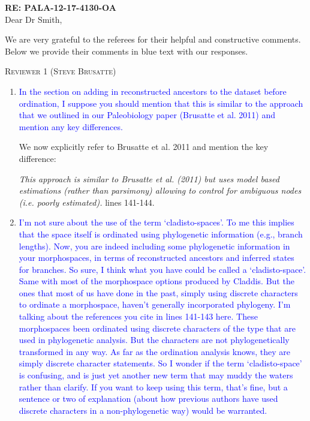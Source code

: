 \documentclass[12pt,letterpaper]{article}
\renewcommand{\section}[1]{%
\bigskip
\begin{center}
\begin{Large}
\normalfont\scshape #1
\medskip
\end{Large}
\end{center}}
\begin{document}
\textbf{RE: PALA-12-17-4130-OA}\\
\bigskip
Dear Dr Smith,\\
\bigskip

We are very grateful to the referees for their helpful and constructive comments. 
Below we provide their comments in blue text with our responses.

%
%

\section{Reviewer 1 (Steve Brusatte)}

\begin{enumerate}

\item{\textcolor{blue}{In the section on adding in reconstructed ancestors to the dataset before ordination, I suppose you should mention that this is similar to the approach that we outlined in our Paleobiology paper (Brusatte et al. 2011) and mention any key differences.}}

We now explicitly refer to Brusatte et al. 2011 and mention the key difference:

\textit{This approach is similar to Brusatte et al. (2011) but uses model based estimations (rather than parsimony) allowing to control for ambiguous nodes (i.e. poorly estimated).} lines 141-144.

\item{\textcolor{blue}{I'm not sure about the use of the term ‘cladisto-spaces’. To me this implies that the space itself is ordinated using phylogenetic information (e.g., branch lengths). Now, you are indeed including some phylogenetic information in your morphospaces, in terms of reconstructed ancestors and inferred states for branches. So sure, I think what you have could be called a ‘cladisto-space’. Same with most of the morphospace options produced by Claddis. But the ones that most of us have done in the past, simply using discrete characters to ordinate a morphospace, haven't generally incorporated phylogeny. I’m talking about the references you cite in lines 141-143 here. These morphospaces been ordinated using discrete characters of the type that are used in phylogenetic analysis. But the characters are not phylogenetically transformed in any way. As far as the ordination analysis knows, they are simply discrete character statements. So I wonder if the term ‘cladisto-space’ is confusing, and is just yet another new term that may muddy the waters rather than clarify. If you want to keep using this term, that's fine, but a sentence or two of explanation (about how previous authors have used discrete characters in a non-phylogenetic way) would be warranted.}}


\end{enumerate}
\end{document}
